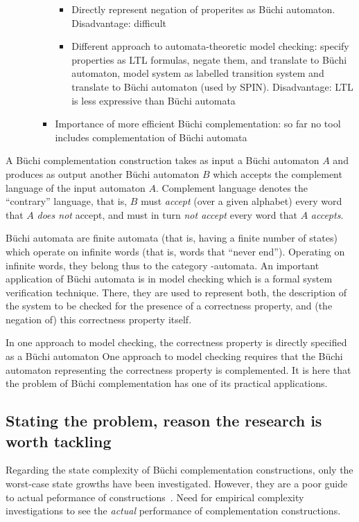 \begin{itemize}
\begin{itemize}
\begin{itemize}
\begin{itemize}
      \item Directly represent negation of properites as Büchi automaton. Disadvantage: difficult
      \item Different approach to automata-theoretic model checking: specify properties as LTL formulas, negate them, and translate to Büchi automaton, model system as labelled transition system and translate to Büchi automaton (used by SPIN). Disadvantage: LTL is less expressive than Büchi automata
      \end{itemize}
    \item Importance of more efficient Büchi complementation: so far no tool includes complementation of Büchi automata~\cite{2007_vardi_model_checking}
    \end{itemize}
  \end{itemize}
\end{itemize}


A Büchi complementation construction takes as input a Büchi automaton $A$ and produces as output another Büchi automaton $B$ which accepts the complement language of the input automaton $A$. Complement language denotes the ``contrary'' language, that is, $B$ must \emph{accept} (over a given alphabet) every word that $A$ \emph{does not} accept, and must in turn \emph{not accept} every word that $A$ \emph{accepts}.

Büchi automata are finite automata (that is, having a finite number of states) which operate on infinite words (that is, words that ``never end''). Operating on infinite words, they belong thus to the category \om-automata. An important application of Büchi automata is in model checking which is a formal system verification technique. There, they are used to represent both, the description of the system to be checked for the presence of a correctness property, and (the negation of) this correctness property itself.

In one approach to model checking, the correctness property is directly specified as a Büchi automaton
One approach to model checking requires that the Büchi automaton representing the correctness property is complemented. It is here that the problem of Büchi complementation has one of its practical applications. 

\subsection{Stating the problem, reason the research is worth tackling}

Regarding the state complexity of Büchi complementation constructions, only the worst-case state growths have been investigated. However, they are a poor guide to actual peformance of constructions~\cite{2011_tsai}. Need for empirical complexity investigations to see the \textit{actual} performance of complementation constructions.

